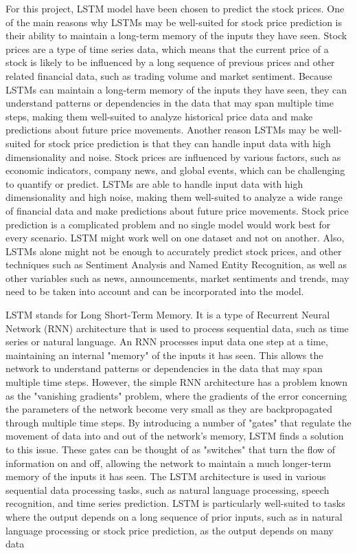 \documentclass[a4paper,twoside,12pt]{book}
\begin{document}
\begin{itemize}
For this project, LSTM model have been chosen to predict the stock prices. 
One of the main reasons why LSTMs may be well-suited for stock price prediction is their ability to maintain a long-term memory of the inputs they have seen. Stock prices are a type of time series data, which means that the current price of a stock is likely to be influenced by a long sequence of previous prices and other related financial data, such as trading volume and market sentiment. Because LSTMs can maintain a long-term memory of the inputs they have seen, they can understand patterns or dependencies in the data that may span multiple time steps, making them well-suited to analyze historical price data and make predictions about future price movements.
Another reason LSTMs may be well-suited for stock price prediction is that they can handle input data with high dimensionality and noise. Stock prices are influenced by various factors, such as economic indicators, company news, and global events, which can be challenging to quantify or predict. LSTMs are able to handle input data with high dimensionality and high noise, making them well-suited to analyze a wide range of financial data and make predictions about future price movements.
Stock price prediction is a complicated problem and no single model would work best for every scenario. LSTM might work well on one dataset and not on another. Also, LSTMs alone might not be enough to accurately predict stock prices, and other techniques such as Sentiment Analysis and Named Entity Recognition, as well as other variables such as news, announcements, market sentiments and trends, may need to be taken into account and can be incorporated into the model.


LSTM stands for Long Short-Term Memory. It is a type of Recurrent Neural Network (RNN) architecture that is used to process sequential data, such as time series or natural language.
An RNN processes input data one step at a time, maintaining an internal "memory" of the inputs it has seen. This allows the network to understand patterns or dependencies in the data that may span multiple time steps. However, the simple RNN architecture has a problem known as the "vanishing gradients" problem, where the gradients of the error concerning the parameters of the network become very small as they are backpropagated through multiple time steps.
By introducing a number of "gates" that regulate the movement of data into and out of the network's memory, LSTM finds a solution to this issue. These gates can be thought of as "switches" that turn the flow of information on and off, allowing the network to maintain a much longer-term memory of the inputs it has seen.
The LSTM architecture is used in various sequential data processing tasks, such as natural language processing, speech recognition, and time series prediction. LSTM is particularly well-suited to tasks where the output depends on a long sequence of prior inputs, such as in natural language processing or stock price prediction, as the output depends on many data


\end{itemize}
\end{document}
